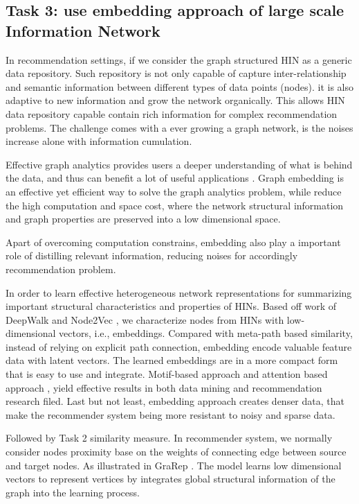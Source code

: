 \documentclass[12pt,a4 paper,title page]{article}
\theoremstyle{definition}
\begin{document}
\subsection{Task 3: use embedding approach of large scale Information Network}

In recommendation settings, if we consider the graph structured HIN as a generic data repository. Such repository is not only capable of capture inter-relationship and semantic information between different types of data points (nodes). it is also adaptive to new information and grow the network organically. This allows HIN data repository capable contain rich information for complex recommendation problems. The challenge comes with a ever growing a graph network, is the noises increase alone with information cumulation.

Effective graph analytics provides users a deeper understanding of what is behind the data, and thus can benefit a lot of useful applications \citep{Cai2018}. Graph embedding is an effective yet efficient way to solve the graph analytics problem, while reduce the high computation and space cost, where the network structural information and graph properties are preserved into a low dimensional space.

Apart of overcoming computation constrains, embedding also play a important role of distilling relevant information, reducing noises for accordingly recommendation problem.

In order to learn effective heterogeneous network representations for summarizing important structural characteristics and properties of HINs. Based off work of DeepWalk \citep{perozzi2014deepwalk} and Node2Vec \citep{grover2016node2vec}, we characterize nodes from HINs with low-dimensional vectors, i.e., embeddings. 
Compared with meta-path based similarity, instead of relying on explicit path connection, embedding encode valuable feature data with latent vectors. The learned embeddings are in a more compact form that is easy to use and integrate. 
Motif-based approach \citep{tsourakakis2017scalable} and attention based approach \citep{Hu2018}, \citep{lee2018graph} yield effective results in both data mining and recommendation research filed.
Last but not least, embedding approach creates denser data, that make the recommender system being more resistant to noisy and sparse data. 

Followed by Task 2 similarity measure. In recommender system, we normally consider nodes proximity base on the weights of connecting edge between source and target nodes. As illustrated in GraRep \citep{cao2015grarep}. The model learns low dimensional vectors to represent vertices by integrates global structural information of the graph into the learning process.
\end{document}
